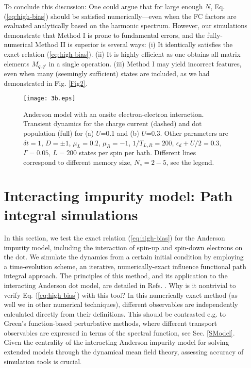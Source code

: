 \documentclass[aps,pra,twocolumn,groupedaddress,showpacs,superscriptaddress,amssymb,amsmath]{revtex4-1}
\begin{document}

To conclude this discussion: One could argue that for large enough $N$, Eq. (\ref{eq:high-bias}) 
should be satisfied numerically---even when the FC factors
are evaluated analytically based on the harmonic spectrum.
However, our simulations demonstrate that Method I is prone to 
fundamental errors, and the fully-numerical Method II is superior is several ways:
(i) It identically satisfies the exact relation (\ref{eq:high-bias}).
(ii) It is highly efficient as one obtains all matrix elements $M_{q,q'}$ in a single operation.
(iii)  Method I may yield  incorrect features, even when many (seemingly sufficient) states are included,
as we had demonstrated in Fig. \ref{Fig2}.



\begin{figure*}
\texttt{[image: 3b.eps]}         %
\caption{
Anderson model with an onsite electron-electron interaction.
Transient dynamics for the charge current (dashed) and dot population (full) for
(a) $U$=0.1 and (b) $U$=0.3.
Other parameters are $\delta t=1$, $D=\pm 1$, $\mu_L=0.2$, $\mu_R=-1$, $1/T_{L,R}=200$, $\epsilon_d+U/2=0.3$,
$\Gamma=0.05$, $L=200$ states per spin per bath.
Different lines correspond to different memory size, $N_s=2-5$, see the legend.
}
\label{Fig3}
\end{figure*}


\section{Interacting impurity model: Path integral simulations}
\label{SINFPI}

In this section, we test the  exact relation (\ref{eq:high-bias}) for 
the Anderson impurity model, including the interaction of spin-up and spin-down electrons on the dot.
We simulate the dynamics from a certain initial condition by employing a time-evolution scheme, 
an iterative, numerically-exact influence functional path integral approach.
The principles of this method, and its application to the interacting Anderson dot model, are detailed in Refs. \cite{IF1,IF2}.
Why is it nontrivial to verify Eq. (\ref{eq:high-bias}) with this tool?
In this numerically exact method (as well we in other numerical techniques), 
different observables are independently calculated directly from their definitions.
This should be contrasted e.g. to Green's function-based perturbative methods, where different transport observables are expressed
in terms of the spectral function, see Sec. \ref{SModel}. 
Given the centrality of the interacting Anderson impurity model 
for solving extended models through the dynamical mean field theory,
assessing accuracy of simulation tools is crucial.
\end{document}
